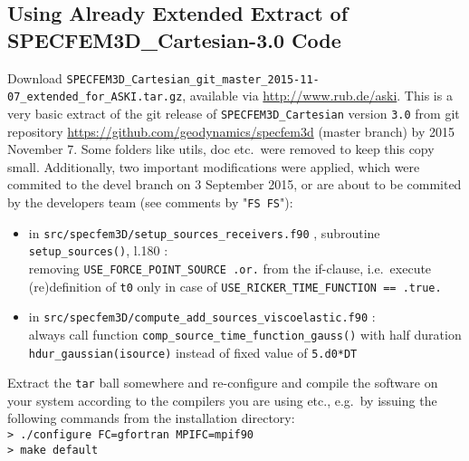 \documentclass[12pt,a4paper]{article}
\newcommand{\lcode}[1]{\nolinkurl{#1}}
\newcommand{\lcodetitle}[1]{ {\ttfamily #1} }
\begin{document}
\subsection{Using Already Extended Extract of \lcodetitle{SPECFEM3D\_Cartesian-3.0} Code} \label{use_modified_SPECFEM}
Download \lcode{SPECFEM3D_Cartesian_git_master_2015-11-07_extended_for_ASKI.tar.gz}, available via 
\url{http://www.rub.de/aski}. This is a very basic extract of the git release of \lcode{SPECFEM3D_Cartesian} 
version \lcode{3.0} from git repository \url{https://github.com/geodynamics/specfem3d} (master branch) by
2015 November 7. Some folders like utils, doc etc.\ were removed to keep this copy small.
Additionally, two important modifications were applied, which were commited
to the devel branch on 3 September 2015, or are about to be commited by the 
developers team  (see comments by "\lcode{FS FS}"):
\begin{itemize}
\item in \lcode{src/specfem3D/setup_sources_receivers.f90} , subroutine \lcode{setup_sources()}, l.180 :\\
   removing \lcode{USE_FORCE_POINT_SOURCE .or.} from the if-clause, i.e.\ execute
   (re)definition of \lcode{t0} only in case of \lcode{USE_RICKER_TIME_FUNCTION == .true.}
 \item in \lcode{src/specfem3D/compute_add_sources_viscoelastic.f90} :\\
   always call function \lcode{comp_source_time_function_gauss()} with half duration
   \lcode{hdur_gaussian(isource)} instead of fixed value of \lcode{5.d0*DT}
\end{itemize}

Extract the \lcode{tar} ball somewhere and re-configure and compile the software on your system according 
to the compilers you are using etc., e.g.\ by issuing the following commands from the installation directory:\\
\lcode{> ./configure FC=gfortran MPIFC=mpif90}\\
\lcode{> make default}


\end{document}
